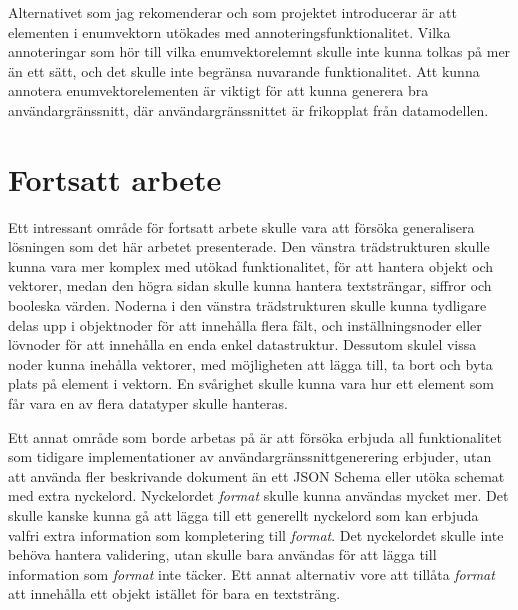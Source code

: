 Alternativet som jag rekomenderar och som projektet introducerar är att elementen i enumvektorn utökades med annoteringsfunktionalitet. Vilka annoteringar som hör till vilka enumvektorelemnt skulle inte kunna tolkas på mer än ett sätt, och det skulle inte begränsa nuvarande funktionalitet. Att kunna annotera enumvektorelementen är viktigt för att kunna generera bra användargränssnitt, där användargränssnittet är frikopplat från datamodellen.

\section{Fortsatt arbete}
Ett intressant område för fortsatt arbete skulle vara att försöka generalisera lösningen som det här arbetet presenterade. Den vänstra trädstrukturen skulle kunna vara mer komplex med utökad funktionalitet, för att hantera objekt och vektorer, medan den högra sidan skulle kunna hantera textsträngar, siffror och booleska värden. Noderna i den vänstra trädstrukturen skulle kunna tydligare delas upp i objektnoder för att innehålla flera fält, och inställningsnoder eller lövnoder för att innehålla en enda enkel datastruktur. Dessutom skulel vissa noder kunna inehålla vektorer, med möjligheten att lägga till, ta bort och byta plats på element i vektorn. En svårighet skulle kunna vara hur ett element som får vara en av flera datatyper skulle hanteras.

Ett annat område som borde arbetas på är att försöka erbjuda all funktionalitet som tidigare implementationer av användargränssnittgenerering erbjuder, utan att använda fler beskrivande dokument än ett JSON Schema eller utöka schemat med extra nyckelord. Nyckelordet \textit{format} skulle kunna användas mycket mer. Det skulle kanske kunna gå att lägga till ett generellt nyckelord som kan erbjuda valfri extra information som kompletering till \textit{format}. Det nyckelordet skulle inte behöva hantera validering, utan skulle bara användas för att lägga till information som \textit{format} inte täcker. Ett annat alternativ vore att tillåta \textit{format} att innehålla ett objekt istället för bara en textsträng.

